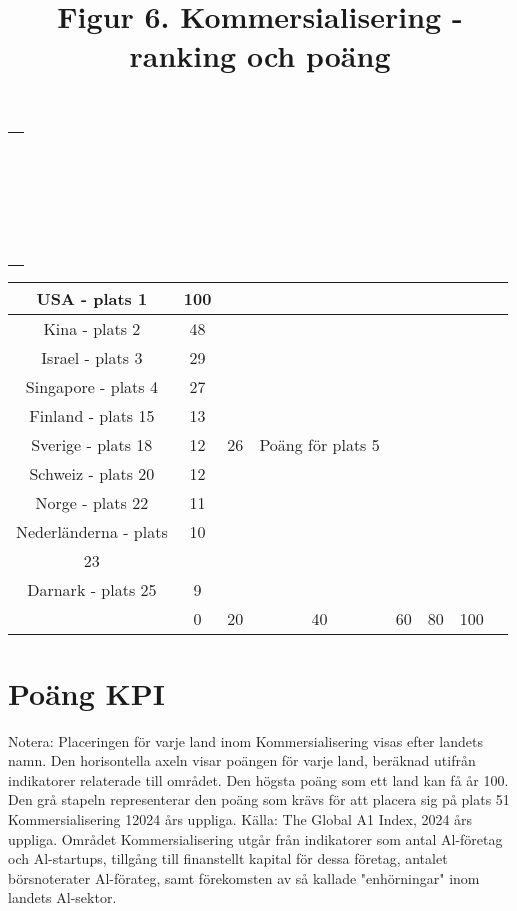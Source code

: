 {{{{{\begin{tabular}{l}
\\
\\
\\
\\
\\
\\
\\
\\
\\
\\
\\ \\
\\
\\
\\
\\
\\
\\
\\
\\
\\
\\ & \\
\end{tabular}

\title{
Figur 6. Kommersialisering - ranking och poäng
}
\begin{tabular}{|c|c|c|c|c|c|c|c|}
\hline USA - plats 1 & 100 & & & & & & \\
\hline Kina - plats 2 & 48 & & & & & & \\
\hline Israel - plats 3 & 29 & & & & & & \\
\hline Singapore - plats 4 & 27 & & & & & & \\
\hline Finland - plats 15 & 13 & & & & & & \\
\hline Sverige - plats 18 & 12 & 26 & Poäng för plats 5 & & & & \\
\hline Schweiz - plats 20 & 12 & & & & & & \\
\hline Norge - plats 22 & 11 & & & & & & \\
\hline Nederländerna - plats & 10 & & & & & & \\
\hline 23 & & & & & & & \\
\hline Darnark - plats 25 & 9 & & & & & & \\
\hline & 0 & 20 & 40 & 60 & 80 & 100 & \\
\hline
\end{tabular}
\section*{Poäng KPI}
Notera: Placeringen för varje land inom Kommersialisering visas efter landets namn. Den horisontella axeln visar poängen för varje land, beräknad utifrån indikatorer relaterade till området. Den högsta poäng som ett land kan få år 100. Den grå stapeln representerar den poäng som krävs för att placera sig på plats 51 Kommersialisering 12024 års uppliga.
Källa: The Global A1 Index, 2024 års uppliga.
Området Kommersialisering utgår från indikatorer som antal Al-företag och Al-startups, tillgång till finanstellt kapital för dessa företag, antalet börsnoterater Al-förateg, samt förekomsten av så kallade "enhörningar" inom landets Al-sektor.
}}}}}
